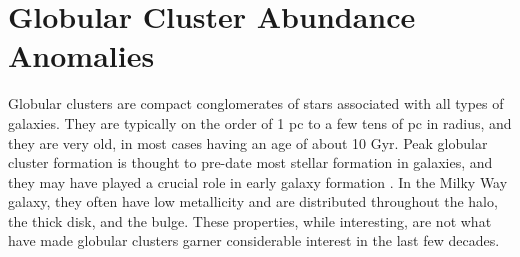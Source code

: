 \section{Globular Cluster Abundance Anomalies} \label{sec:GC_Candidate}




Globular clusters are compact conglomerates of stars associated with all types of galaxies. They are typically on the order of 1 pc to a few tens of pc in radius, and they are very old, in most cases having an age of about 10 Gyr. Peak globular cluster formation is thought to pre-date most stellar formation in galaxies, and they may have played a crucial role in early galaxy formation \cite{Gratton2019}. In the Milky Way galaxy, they often have low metallicity and are distributed throughout the halo, the thick disk, and the bulge. These properties, while interesting, are not what have made globular clusters garner considerable interest in the last few decades.

